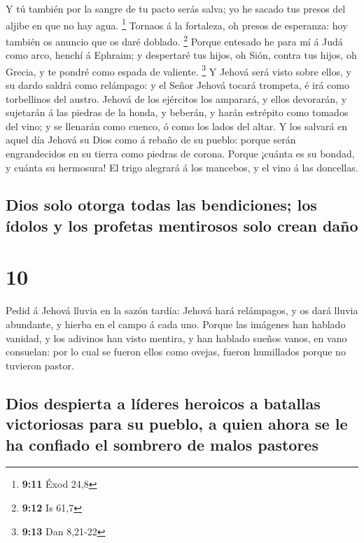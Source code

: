  Y tú también por la sangre de tu pacto serás salva; yo he
sacado tus presos del aljibe en que no hay agua. \footnote{\textbf{9:11}
  Éxod 24,8}  Tornaos á la fortaleza, oh presos de
esperanza: hoy también os anuncio que os daré doblado. \footnote{\textbf{9:12}
  Is 61,7}  Porque entesado he para mí á Judá como arco,
henchí á Ephraim; y despertaré tus hijos, oh Sión, contra tus hijos, oh
Grecia, y te pondré como espada de valiente. \footnote{\textbf{9:13} Dan
  8,21-22}  Y Jehová será visto sobre ellos, y su dardo
saldrá como relámpago: y el Señor Jehová tocará trompeta, é irá como
torbellinos del austro.  Jehová de los ejércitos los
amparará, y ellos devorarán, y sujetarán á las piedras de la honda, y
beberán, y harán estrépito como tomados del vino; y se llenarán como
cuenco, ó como los lados del altar.  Y los salvará en aquel
día Jehová su Dios como á rebaño de su pueblo: porque serán
engrandecidos en su tierra como piedras de corona.  Porque
¡cuánta es su bondad, y cuánta su hermosura! El trigo alegrará á los
mancebos, y el vino á las doncellas.

\hypertarget{dios-solo-otorga-todas-las-bendiciones-los-uxeddolos-y-los-profetas-mentirosos-solo-crean-dauxf1o}{%
\subsection{Dios solo otorga todas las bendiciones; los ídolos y los
profetas mentirosos solo crean
daño}\label{dios-solo-otorga-todas-las-bendiciones-los-uxeddolos-y-los-profetas-mentirosos-solo-crean-dauxf1o}}

\hypertarget{section-9}{%
\section{10}\label{section-9}}

 Pedid á Jehová lluvia en la sazón tardía: Jehová hará
relámpagos, y os dará lluvia abundante, y hierba en el campo á cada uno.
 Porque las imágenes han hablado vanidad, y los adivinos han
visto mentira, y han hablado sueños vanos, en vano consuelan: por lo
cual se fueron ellos como ovejas, fueron humillados porque no tuvieron
pastor.

\hypertarget{dios-despierta-a-luxedderes-heroicos-a-batallas-victoriosas-para-su-pueblo-a-quien-ahora-se-le-ha-confiado-el-sombrero-de-malos-pastores}{%
\subsection{Dios despierta a líderes heroicos a batallas victoriosas
para su pueblo, a quien ahora se le ha confiado el sombrero de malos
pastores}\label{dios-despierta-a-luxedderes-heroicos-a-batallas-victoriosas-para-su-pueblo-a-quien-ahora-se-le-ha-confiado-el-sombrero-de-malos-pastores}}

